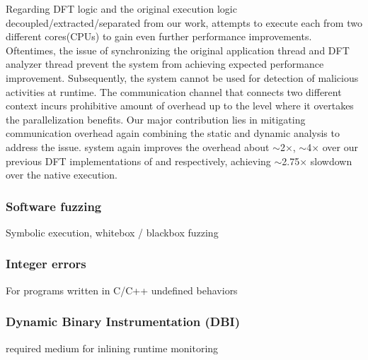 \documentclass[letterpaper, 10pt]{article}
\begin{document}
\begin{small}
Regarding DFT logic and the original execution logic
decoupled/extracted/separated from our \TFA work, \SR attempts to execute each
from two different cores(CPUs) to gain even further performance improvements.
Oftentimes, the issue of synchronizing the original application thread and DFT
analyzer thread prevent the system from achieving expected performance
improvement. Subsequently, the system cannot be used for detection of malicious
activities at runtime.
%
The communication channel that connects two different context incurs
prohibitive amount of overhead up to the level where it overtakes the
parallelization benefits. Our major contribution lies in mitigating
communication overhead again combining the static and dynamic analysis to
address the issue.
%
\SR system again improves the overhead about  $\sim$2$\times$,  $\sim$4$\times$
over our previous DFT implementations of \TFA and \libdft respectively,
achieving  $\sim$2.75$\times$ slowdown over the native execution. 


\subsubsection*{Software fuzzing}
Symbolic execution, whitebox / blackbox fuzzing

\subsubsection*{Integer errors}
For programs written in C/C++ undefined behaviors

\subsubsection*{Dynamic Binary Instrumentation (DBI)}
required medium for inlining runtime monitoring 

\subsubsection*{}


\end{small}
\end{document}
